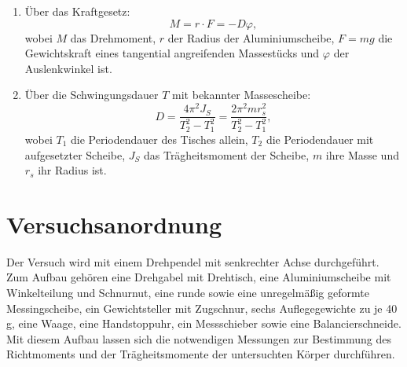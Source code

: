 \begin{enumerate}
    \item Über das Kraftgesetz:
    \begin{equation}
        M = r \cdot F = -D\varphi,
    \end{equation}
    wobei $M$ das Drehmoment, $r$ der Radius der Aluminiumscheibe, $F = mg$ die Gewichtskraft eines tangential angreifenden Massestücks und $\varphi$ der Auslenkwinkel ist.
    
    \item Über die Schwingungsdauer $T$ mit bekannter Massescheibe:
    \begin{equation}
        D = \frac{4\pi^2 J_S}{T_2^2 - T_1^2} = \frac{2\pi^2 m r_s^2}{T_2^2 - T_1^2},
    \end{equation}
    wobei $T_1$ die Periodendauer des Tisches allein, $T_2$ die Periodendauer mit aufgesetzter Scheibe, $J_S$ das Trägheitsmoment der Scheibe, $m$ ihre Masse und $r_s$ ihr Radius ist.
\end{enumerate}

\section{Versuchsanordnung}
    Der Versuch wird mit einem Drehpendel mit senkrechter Achse durchgeführt. Zum Aufbau gehören eine Drehgabel mit Drehtisch, eine Aluminiumscheibe mit Winkelteilung und Schnurnut, eine runde sowie eine unregelmäßig geformte Messingscheibe, ein Gewichtsteller mit Zugschnur, sechs Auflegegewichte zu je 40 g, eine Waage, eine Handstoppuhr, ein Messschieber sowie eine Balancierschneide. Mit diesem Aufbau lassen sich die notwendigen Messungen zur Bestimmung des Richtmoments und der Trägheitsmomente der untersuchten Körper durchführen.
